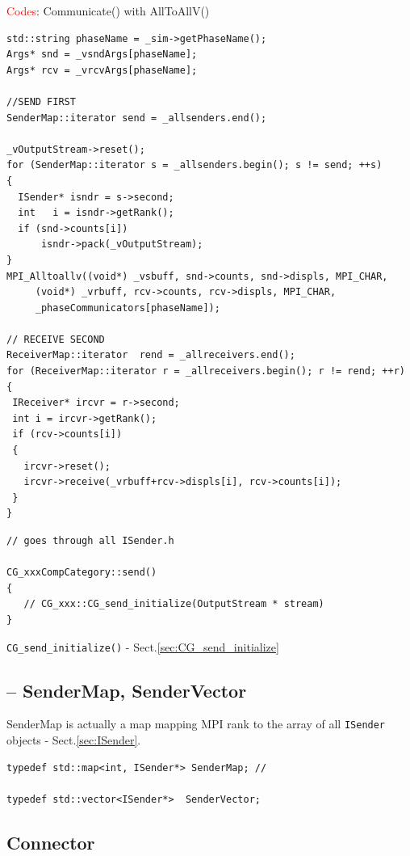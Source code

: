 \textcolor{red}{Codes}: Communicate() with AllToAllV()
\begin{verbatim}
std::string phaseName = _sim->getPhaseName();
Args* snd = _vsndArgs[phaseName];
Args* rcv = _vrcvArgs[phaseName];

//SEND FIRST
SenderMap::iterator send = _allsenders.end();

_vOutputStream->reset();
for (SenderMap::iterator s = _allsenders.begin(); s != send; ++s)
{
  ISender* isndr = s->second;
  int   i = isndr->getRank();
  if (snd->counts[i])
      isndr->pack(_vOutputStream);
}
MPI_Alltoallv((void*) _vsbuff, snd->counts, snd->displs, MPI_CHAR,
     (void*) _vrbuff, rcv->counts, rcv->displs, MPI_CHAR, 
     _phaseCommunicators[phaseName]);

// RECEIVE SECOND
ReceiverMap::iterator  rend = _allreceivers.end();
for (ReceiverMap::iterator r = _allreceivers.begin(); r != rend; ++r)
{
 IReceiver* ircvr = r->second;
 int i = ircvr->getRank();
 if (rcv->counts[i])
 {
   ircvr->reset();
   ircvr->receive(_vrbuff+rcv->displs[i], rcv->counts[i]);
 }
}
\end{verbatim}

\begin{verbatim}
// goes through all ISender.h

CG_xxxCompCategory::send() 
{
   // CG_xxx::CG_send_initialize(OutputStream * stream)
}
\end{verbatim}

\verb!CG_send_initialize()! - Sect.\ref{sec:CG_send_initialize}

\subsection{-- SenderMap, SenderVector}
\label{sec:SenderMap}
\label{sec:SenderVector}

SenderMap is actually a map mapping MPI rank to the array of all \verb!ISender!
objects - Sect.\ref{sec:ISender}.
 
\begin{verbatim}
typedef std::map<int, ISender*> SenderMap; //

typedef std::vector<ISender*>  SenderVector; 
\end{verbatim}



\subsection{Connector}
\label{sec:Connector}
\label{sec:connector-functor}
\label{sec:functor-connector}

